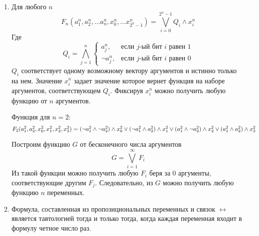 \documentclass[10pt]{article}
\begin{document}
\begin{enumerate}[i]
\item Для любого $n$ 
$$F_n(a_1^n, a_2^n, \ldots a_n^n, x_0^n, \ldots x_{2^n-1}^n) = \bigvee_{i=0}^{2^n-1} Q_i \land x_i^n$$
Где $$Q_i = \bigwedge_{j=1}^n \begin{cases} 
a_j^n,&\text{если $j$-ый бит $i$ равен $1$}\\
\neg a_j^n,&\text{если $j$-ый бит $i$ равен $0$} 
\end{cases}$$
$Q_i$ соответствует одному возможному вектору аргументов и истинно только на нем. Значение $x_i^n$ задает значение которое вернет функция на наборе аргументов, соответствующем $Q_i$. Фиксируя $x_i^n$ можно получить любую функцию от $n$ аргументов.

Функция для $n=2$:
$$
F_2(a_1^2, a_2^2, x_0^2, x_1^2, x_2^2, x_3^2)= \\
(\neg a_1^2 \land \neg a_2^2) \land x_0^2 \lor \\
(\neg a_1^2 \land a_2^2) \land x_1^2 \lor \\
(a_1^2 \land \neg a_2^2) \land x_2^2 \lor \\
(a_1^2 \land a_2^2) \land x_3^2
$$

Построим функцию $G$ от бесконечного числа аргументов
$$G = \bigvee_{i=1}^{\infty} F_i$$
Из такой функции можно получить любую $F_i$ беря за 0 аргументы, соответствующие другим $F_j$. Следовательно, из $G$ можно получить любую функцию $n$ переменных.

\item Формула, составленная из пропозициональных переменных и связок $\leftrightarrow$ является тавтологией тогда и только тогда, когда каждая переменная входит в формулу четное число раз.


\end{enumerate}
\end{document}
